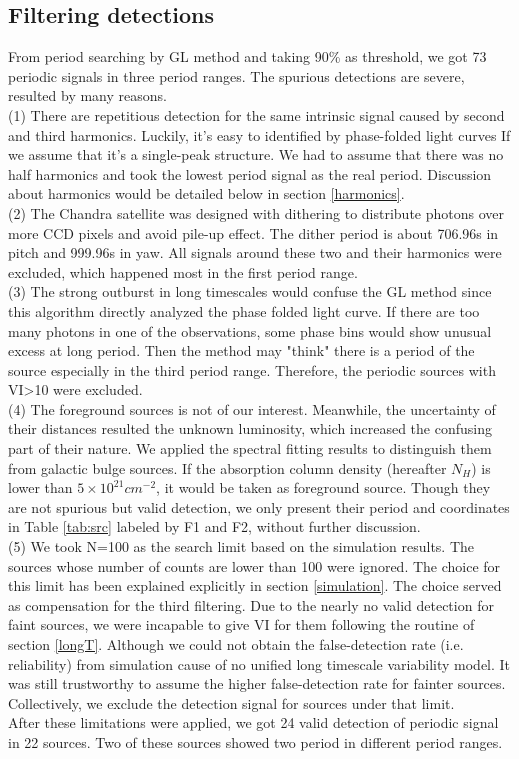 \documentclass[twoside,twocolumn]{aastex63}
\begin{document}
\subsection{Filtering detections}
From period searching by GL method and taking 90\% as threshold, we got 73 periodic signals in three period ranges. The spurious detections are severe, resulted by many reasons.
\\
\indent
(1) There are repetitious detection for the same intrinsic signal caused by second and third harmonics. Luckily, it's easy to identified by phase-folded light curves If we assume that it's a single-peak structure. We had to assume that there was no half harmonics and took the lowest period signal as the real period. Discussion about harmonics would be detailed below in section \ref{harmonics}. 
\\
\indent
(2) The Chandra satellite was designed with dithering to distribute photons over more CCD pixels and avoid pile-up effect. The dither period is about 706.96s in pitch and 999.96s in yaw. All signals around these two and their harmonics were excluded, which happened most in the first period range.
\\
\indent
(3) The strong outburst in long timescales would confuse the GL method since this algorithm directly analyzed the phase folded light curve. If there are too many photons in one of the observations, some phase bins would show unusual excess at long period. Then the method may "think" there is a period of the source especially in the third period range. Therefore, the periodic sources with VI>10 were excluded. 
\\
\indent
(4) The foreground sources is not of our interest. Meanwhile, the uncertainty of their distances resulted the unknown luminosity, which increased the confusing part of their nature. We applied the spectral fitting results to distinguish them from galactic bulge sources. If the absorption column density (hereafter $N_{H}$) is lower than $5 \times 10^{21} cm^{-2}$, it would be taken as foreground source. Though they are not spurious but valid detection, we only present their period and coordinates in Table \ref{tab:src} labeled by F1 and F2, without further discussion.
\\
\indent
(5) We took N=100 as the search limit based on the simulation results. The sources whose number of counts are lower than 100 were ignored. The choice for this limit has been explained explicitly in section \ref{simulation}. The choice served as compensation for the third filtering. Due to the nearly no valid detection for faint sources, we were incapable to give VI for them following the routine of section \ref{longT}. Although we could not obtain the false-detection rate (i.e. reliability) from simulation cause of no unified long timescale variability model. It was still trustworthy to assume the higher false-detection rate for fainter sources. Collectively, we exclude the detection signal for sources under that limit. 
\\
\indent
After these limitations were applied, we got 24 valid detection of periodic signal in 22 sources. Two of these sources showed two period in different period ranges.
\end{document}
